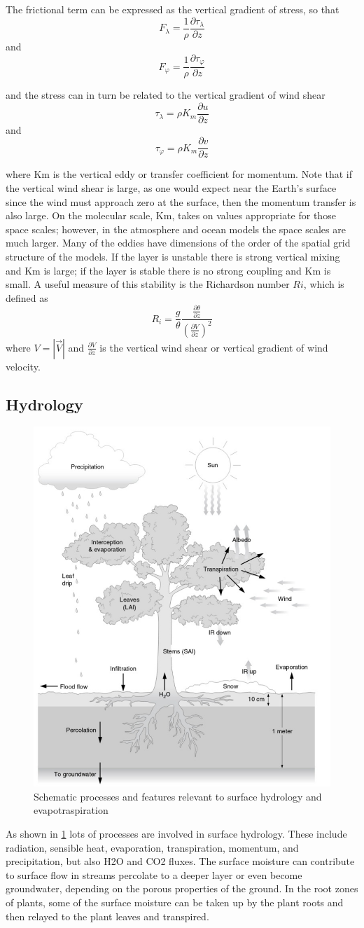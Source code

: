 The frictional term can be expressed as the vertical gradient of stress, so that $$F_\lambda = \frac{1}{\rho} \frac{\partial \tau_\lambda}{\partial z}$$
and $$F_\varphi = \frac{1}{\rho} \frac{\partial \tau_\varphi}{\partial z}$$


and the stress can in turn be related to the vertical gradient of wind shear
$$\tau_\lambda = \rho K_m \frac{\partial u}{\partial z}$$
and $$\tau_\varphi = \rho K_m \frac{\partial v}{\partial z}$$

where Km is the vertical eddy or transfer coefficient for momentum. Note that if the vertical wind shear is large, as one would expect near the Earth's surface since the wind must approach zero at the surface, then the momentum transfer is also large. On the molecular scale, Km, takes on values appropriate for those space scales; however, in the atmosphere and ocean models the space scales are much larger. Many of the eddies have dimensions of the order of the spatial grid structure of the models.
If the layer is unstable there is strong vertical mixing and Km is large; if the layer is stable there is no strong coupling and Km is small. A useful measure of this stability is the Richardson number $Ri$, which is defined as
$$R_i = \frac{g}{\theta} \frac{\frac{\partial \theta}{\partial z}}{\left( \frac{\partial V}{\partial z} \right)^2}$$
where $V = \left| \vec{V} \right|$ and $\frac{\partial V}{\partial z}$ is the vertical wind shear or vertical gradient of wind velocity.

\subsection{Hydrology}
\begin{figure}[htp!]
	\centering
	\includegraphics[width=0.5\linewidth]{upload/15image.png}
	\caption{Schematic processes and features relevant to surface hydrology and evapotraspiration}
	\label{fig: fig 2}
\end{figure}
As shown in \ref{fig: fig 2} lots of processes are involved in surface hydrology. These include radiation, sensible heat, evaporation, transpiration, momentum, and precipitation, but also H2O and CO2 fluxes. The surface moisture can contribute to surface flow in streams percolate to a deeper layer or even become groundwater, depending on the porous properties of the ground. In the root zones of plants, some of the surface moisture can be taken up by the plant roots and then relayed to the plant leaves and transpired.

